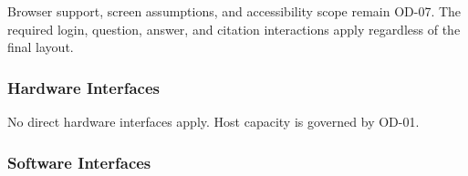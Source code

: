 \documentclass[11pt,letterpaper]{article}
\begin{document}
\endgroup

Browser support, screen assumptions, and accessibility scope remain OD-07. The required login, question, answer, and citation interactions apply regardless of the final layout.\par

\subsubsection{Hardware Interfaces}

No direct hardware interfaces apply. Host capacity is governed by OD-01.\par

\subsubsection{Software Interfaces}

\begingroup\small
\end{document}
